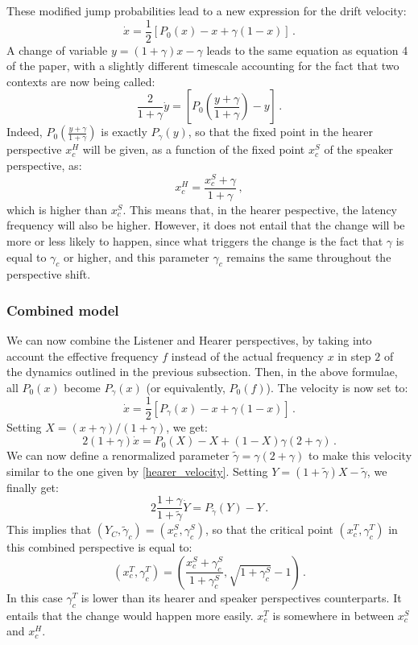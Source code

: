 \documentclass[12pt,twocolumn,amsmath,amssymb,aps,longbibliography]{revtex4-1}  %
\newcommand{\beq}{\begin{equation}}
\newcommand{\eneq}{\end{equation}}
\begin{document}
These modified jump probabilities lead to a new expression for the drift velocity:
\beq \label{hearer_velocity}
\dot{x} = \frac{1}{2} \left[ P_0(x) - x + \gamma (1-x) \right ] \, .
\eneq
A change of variable $y = (1 + \gamma) x - \gamma$ leads to the same equation as equation 4 of the paper, with a slightly different timescale accounting for the fact that two contexts are now being called:
\beq
\frac{2}{1+\gamma}\dot{y}  = \left[ P_0\left( \frac{y + \gamma}{1 + \gamma} \right) - y \right ] \, .
\eneq 
Indeed, $P_0\left( \frac{y + \gamma}{1 + \gamma} \right)$ is exactly $P_{\gamma}(y)$, so that the fixed point in the hearer perspective $x_c ^{H}$ will be given, as a function of the fixed point $x_c^S$ of the speaker perspective, as:
\beq
x_c ^ H = \frac{x_c ^ S + \gamma} {1+\gamma} \, ,
\eneq
which is higher than $x_c^S$. This means that, in the hearer pespective, the latency frequency will also be higher. However, it does not entail that the change will be more or less likely to happen, since what triggers the change is the fact that $\gamma$ is equal to $\gamma_c$ or higher, and this parameter $\gamma_c$ remains the same throughout the perspective shift. 

\subsubsection{Combined model}

We can now combine the Listener and Hearer perspectives, by taking into account the effective frequency $f$ instead of the actual frequency $x$ in step $2$ of the dynamics outlined in the previous subsection. Then, in the above formulae, all $P_0(x)$ become $P_{\gamma}(x)$ (or equivalently, $P_0(f)$). The velocity is now set to:
\beq \label{total_velocity}
\dot{x} = \frac{1}{2} \left[ P_{\gamma}(x) - x + \gamma (1-x) \right ] \, .
\eneq
Setting $X = (x + \gamma) / (1  +\gamma)$, we get:
\beq
2 (1 + \gamma) \dot{x} = P_0(X) - X  + (1 - X) \gamma (2 + \gamma) \, .
\eneq
We can now define a renormalized parameter $\tilde{\gamma} = \gamma ( 2 +\gamma) $ to make this velocity similar to the one given by \eqref{hearer_velocity}. Setting $Y  = (1 + \tilde{\gamma}) X - \tilde{\gamma}$, we finally get:
\beq
2 \frac{1+\gamma}{1+\tilde{\gamma}} \dot{Y} = P_{\tilde{\gamma}}(Y) - Y \, .
\eneq
This implies that $(Y_C, \tilde{\gamma}_c) = (x_c^S, \gamma_c^S)$, so that the critical point $(x_c^T, \gamma_c^T)$ in this combined perspective is equal to:
\beq
(x_c^T, \gamma_c^T) = \left( \frac{x_c^S + \gamma_c^S}{1 + \gamma_c^S}  , \sqrt{1 + \gamma_c^S} - 1 \right) \, .
\eneq
In this case $\gamma_c^T$ is lower than its hearer and speaker perspectives counterparts. It entails that the change would happen more easily. $x_c^T$ is somewhere in between $x_c^S$ and $x_c^H$.
\end{document}
